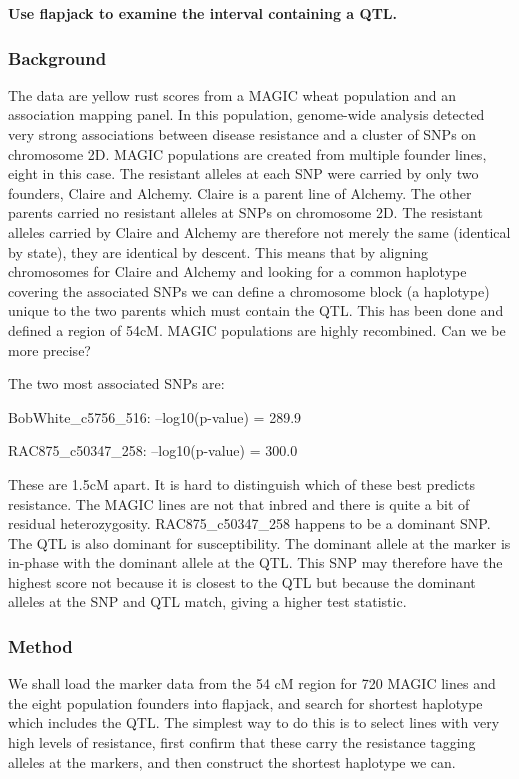 \documentclass[
]{book}
\begin{document}
\textbf{Use flapjack to examine the interval containing a QTL.}

\hypertarget{background}{%
\subsubsection{Background}\label{background}}

The data are yellow rust scores from a MAGIC wheat population and an association mapping panel. In this population, genome-wide analysis detected very strong associations between disease resistance and a cluster of SNPs on chromosome 2D. MAGIC populations are created from multiple founder lines, eight in this case. The resistant alleles at each SNP were carried by only two founders, Claire and Alchemy. Claire is a parent line of Alchemy. The other parents carried no resistant alleles at SNPs on chromosome 2D. The resistant alleles carried by Claire and Alchemy are therefore not merely the same (identical by state), they are identical by descent. This means that by aligning chromosomes for Claire and Alchemy and looking for a common haplotype covering the associated SNPs we can define a chromosome block (a haplotype) unique to the two parents which must contain the QTL. This has been done and defined a region of 54cM. MAGIC populations are highly recombined. Can we be more precise?

The two most associated SNPs are:

BobWhite\_c5756\_516: --log10(p-value) = 289.9

RAC875\_c50347\_258: --log10(p-value) = 300.0

These are 1.5cM apart. It is hard to distinguish which of these best predicts resistance. The MAGIC lines are not that inbred and there is quite a bit of residual heterozygosity. RAC875\_c50347\_258 happens to be a dominant SNP. The QTL is also dominant for susceptibility. The dominant allele at the marker is in-phase with the dominant allele at the QTL. This SNP may therefore have the highest score not because it is closest to the QTL but because the dominant alleles at the SNP and QTL match, giving a higher test statistic.

\hypertarget{method}{%
\subsubsection{Method}\label{method}}

We shall load the marker data from the 54 cM region for 720 MAGIC lines and the eight population founders into flapjack, and search for shortest haplotype which includes the QTL. The simplest way to do this is to select lines with very high levels of resistance, first confirm that these carry the resistance tagging alleles at the markers, and then construct the shortest haplotype we can.
\end{document}
